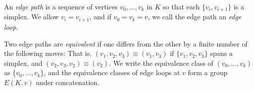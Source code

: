 
\begin{definition}
    An \emph{edge path} is a sequence of vertices $v_0, \ldots, v_k$ in $K$ so that each $\{v_i, v_{i + 1}\}$ is a simplex. We allow $v_i = v_{i + 1}$, and if $v_0 = v_k = v$, we call the edge path an \emph{edge loop}.
\end{definition}

\begin{definition}
    Two edge paths are \emph{equivalent} if one differs from the other by a finite number of the following moves:
    That is, $(v_1, v_2, v_3) \equiv (v_1, v_3)$ if $\{v_1, v_2, v_3\}$ spans a simplex, and $(v_2, v_3, v_2) \equiv (v_2)$. We write the equivalence class of $(v_0, \ldots, v_k)$ as $\{v_0, \ldots, v_k\}$, and the equivalence classes of edge loops at $v$ form a group $E(K, v)$ under concatenation.
\end{definition}

